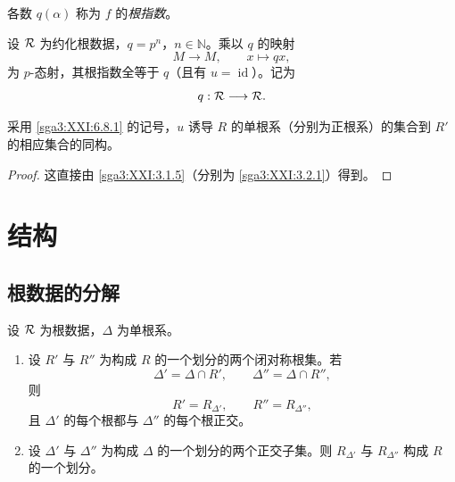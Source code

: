 \begin{definition}\label{sga3:XXI:6.8.5}
各数 \(q(\alpha)\) 称为 \(f\) 的\emph{根指数}。
\end{definition}

\begin{example}\label{sga3:XXI:6.8.6}
设 \(\mathcal{R}\) 为约化根数据，\(q=p^n\)，\(n\in\mathbb N\)。乘以 \(q\) 的映射
\[
 M\longrightarrow M,\qquad x\longmapsto qx,
\]
为 \(p\)-态射，其根指数全等于 \(q\)（且有 \(u=\operatorname{id}\)）。记为
\[
 q:\mathcal{R}\longrightarrow\mathcal{R}.
\]
\end{example}

\begin{proposition}\label{sga3:XXI:6.8.7}
采用 \ref{sga3:XXI:6.8.1} 的记号，\(u\) 诱导 \(R\) 的单根系（分别为正根系）的集合到 \(R'\) 的相应集合的同构。
\end{proposition}

\begin{proof}
这直接由 \ref{sga3:XXI:3.1.5}（分别为 \ref{sga3:XXI:3.2.1}）得到。
\end{proof}

\section{结构}\label{sga3:XXI:7}

\subsection{根数据的分解}\label{sga3:XXI:7.1}

\begin{proposition}\label{sga3:XXI:7.1.1}
设 \(\mathcal{R}\) 为根数据，\(\Delta\) 为单根系。
\begin{enumerate}
\item[\SGAInlineRefTarget{sga3:XXI:7.1.1:item:i}(i)] 设 \(R'\) 与 \(R''\) 为构成 \(R\) 的一个划分的两个闭对称根集。若
  \[
   \Delta'=\Delta\cap R',
   \qquad
   \Delta''=\Delta\cap R'',
  \]
  则
  \[
   R'=R_{\Delta'},
   \qquad
   R''=R_{\Delta''},
  \]
  且 \(\Delta'\) 的每个根都与 \(\Delta''\) 的每个根正交。
\item[\SGAInlineRefTarget{sga3:XXI:7.1.1:item:ii}(ii)] 设 \(\Delta'\) 与 \(\Delta''\) 为构成 \(\Delta\) 的一个划分的两个正交子集。则 \(R_{\Delta'}\) 与 \(R_{\Delta''}\) 构成 \(R\) 的一个划分。
\end{enumerate}
\end{proposition}

